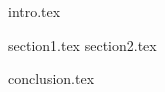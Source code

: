 \documentclass[coursework]{SCWorks}
\begin{document}

\date{2026}

\maketitle

\secNumbering

\tableofcontents




\intro
 {intro.tex}

 {section1.tex}
 {section2.tex}

\conclusion
 {conclusion.tex}

\nocite{*}



\appendix
\end{document}
